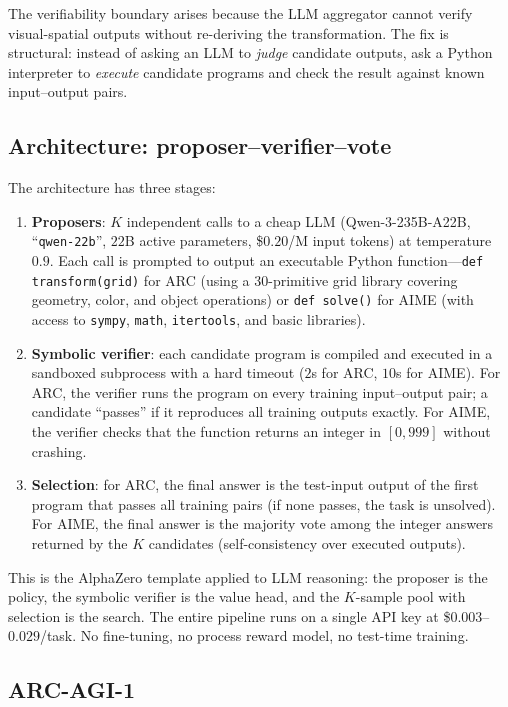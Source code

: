 \documentclass[11pt]{amsart}
\newcommand\1{{\mathds{1}}}
\theoremstyle{definition}
\theoremstyle{remark}
\numberwithin{equation}{section}
\begin{document}
The verifiability boundary arises because the LLM aggregator cannot verify visual-spatial outputs without re-deriving the transformation.
The fix is structural: instead of asking an LLM to \emph{judge} candidate outputs, ask a Python interpreter to \emph{execute} candidate programs and check the result against known input--output pairs.

\subsection{Architecture: proposer--verifier--vote}\label{sec:act2-arch}

The architecture has three stages:
\begin{enumerate}[leftmargin=1.4em, itemsep=2pt]
\item \textbf{Proposers}: $K$ independent calls to a cheap LLM (Qwen-3-235B-A22B, ``\texttt{qwen-22b}'', $22$B active parameters, \$$0.20$/M input tokens) at temperature $0.9$.
Each call is prompted to output an executable Python function---\texttt{def transform(grid)} for ARC (using a $30$-primitive grid library covering geometry, color, and object operations) or \texttt{def solve()} for AIME (with access to \texttt{sympy}, \texttt{math}, \texttt{itertools}, and basic libraries).
\item \textbf{Symbolic verifier}: each candidate program is compiled and executed in a sandboxed subprocess with a hard timeout ($2$s for ARC, $10$s for AIME).
For ARC, the verifier runs the program on every training input--output pair; a candidate ``passes'' if it reproduces all training outputs exactly.
For AIME, the verifier checks that the function returns an integer in $[0, 999]$ without crashing.
\item \textbf{Selection}: for ARC, the final answer is the test-input output of the first program that passes all training pairs (if none passes, the task is unsolved).
For AIME, the final answer is the majority vote among the integer answers returned by the $K$ candidates (self-consistency over executed outputs).
\end{enumerate}

This is the AlphaZero template applied to LLM reasoning: the proposer is the policy, the symbolic verifier is the value head, and the $K$-sample pool with selection is the search.
The entire pipeline runs on a single API key at \$$0.003$--$0.029$/task.
No fine-tuning, no process reward model, no test-time training.

\subsection{ARC-AGI-1}\label{sec:act2-arc}
\end{document}
